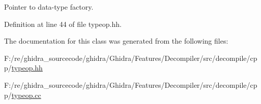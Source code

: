 Pointer to data-\/type factory. 



Definition at line 44 of file typeop.\+hh.



The documentation for this class was generated from the following files\+:\begin{DoxyCompactItemize}
\item 
F\+:/re/ghidra\+\_\+sourcecode/ghidra/\+Ghidra/\+Features/\+Decompiler/src/decompile/cpp/\mbox{\hyperlink{typeop_8hh}{typeop.\+hh}}\item 
F\+:/re/ghidra\+\_\+sourcecode/ghidra/\+Ghidra/\+Features/\+Decompiler/src/decompile/cpp/\mbox{\hyperlink{typeop_8cc}{typeop.\+cc}}\end{DoxyCompactItemize}
